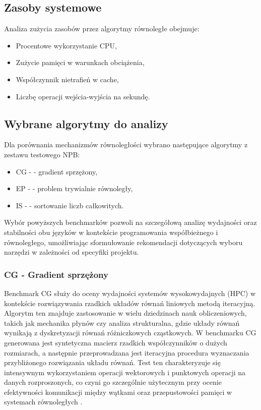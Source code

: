 \subsection{Zasoby systemowe}
Analiza zużycia zasobów przez algorytmy równoległe obejmuje:
\begin{itemize}
\item Procentowe wykorzystanie CPU,
\item Zużycie pamięci w warunkach obciążenia,
\item Współczynnik nietrafień w cache,
\item Liczbę operacji wejścia-wyjścia na sekundę.
\end{itemize}

\subsection{Wybrane algorytmy do analizy}
Dla porównania mechanizmów równoległości wybrano następujące algorytmy z zestawu testowego NPB:
\begin{itemize}
    \item CG -  - gradient sprzężony,
    \item EP -  - problem trywialnie równoległy,
    \item IS -  - sortowanie liczb całkowitych.
\end{itemize}

Wybór powyższych benchmarków pozwoli na szczegółową analizę wydajności oraz stabilności obu języków w kontekście programowania współbieżnego i równoległego, umożliwiając sformułowanie rekomendacji dotyczących wyboru narzędzi w zależności od specyfiki projektu.

\subsubsection{CG - Gradient sprzężony}
Benchmark CG  służy do oceny wydajności systemów wysokowydajnych (HPC) w kontekście rozwiązywania rzadkich układów równań liniowych metodą iteracyjną. Algorytm ten znajduje zastosowanie w wielu dziedzinach nauk obliczeniowych, takich jak mechanika płynów czy analiza strukturalna, gdzie układy równań wynikają z dyskretyzacji równań różniczkowych cząstkowych. W benchmarku CG generowana jest syntetyczna macierz rzadkich współczynników o dużych rozmiarach, a następnie przeprowadzana jest iteracyjna procedura wyznaczania przybliżonego rozwiązania układu równań. Test ten charakteryzuje się intensywnym wykorzystaniem operacji wektorowych i punktowych operacji na danych rozproszonych, co czyni go szczególnie użytecznym przy ocenie efektywności komunikacji między wątkami oraz przepustowości pamięci w systemach równoległych \cite{nasaParallelBenchmarks}.

